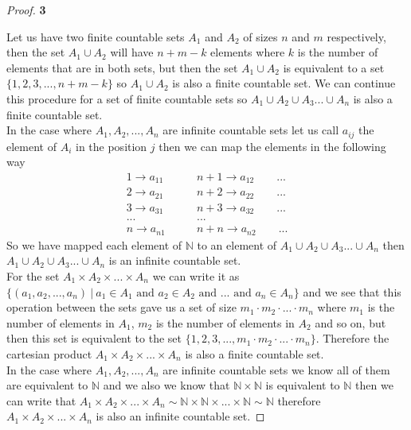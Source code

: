 \documentclass[11pt]{article}
\newcommand{\N}{\mathbb{N}}
\theoremstyle{definition}
\begin{document}
	\begin{proof}{\textbf{3}}

        Let us have two finite countable sets $A_1$ and $A_2$ of sizes $n$ and $m$
        respectively, then the set $A_1 \cup A_2$ will have $n + m - k$ elements
        where $k$ is the number of elements that are in both sets, but then the set
        $A_1 \cup A_2$ is equivalent to a set $\{1,2,3,...,n+m-k\}$ so $A_1 \cup A_2$
        is also a finite countable set.
        We can continue this procedure for a set of finite countable sets so 
        $A_1 \cup A_2 \cup A_3 ... \cup A_n$ is also a finite countable set.\\
        In the case  where $A_1, A_2, ..., A_n$ are infinite countable sets let us call
        $a_{ij}$ the element of $A_i$ in the position $j$ then we can map the elements
        in the following way
        \begin{align*}
            1 \rightarrow a_{11} &\quad\quad n+1 \rightarrow a_{12} \quad\quad ...\\
            2 \rightarrow a_{21} &\quad\quad n+2 \rightarrow a_{22} \quad\quad ...\\
            3 \rightarrow a_{31} &\quad\quad n+3 \rightarrow a_{32} \quad\quad ...\\
            ... &\quad\quad ...\\
            n \rightarrow a_{n1} &\quad\quad n+n \rightarrow a_{n2} \quad\quad ...
        \end{align*}
        So we have mapped each element of $\N$ to an element of
        $A_1 \cup A_2 \cup A_3 ... \cup A_n$ then $A_1 \cup A_2 \cup A_3 ... \cup A_n$
        is an infinite countable set.\\

        For the set $A_1 \times A_2 \times ... \times A_n$ we can write it as
        $\{(a_1, a_2, ..., a_n) ~|~
        a_1 \in A_1\text{ and }a_2 \in A_2\text{ and }... \text{ and }a_n \in A_n\}$ and
         we see that this operation between the sets gave us a set of size
        $m_1 \cdot m_2 \cdot ... \cdot m_n$
        where $m_1$ is the number of elements in $A_1$, $m_2$ is the number of
        elements in $A_2$ and so on, but then this set is equivalent to
        the set $\{1,2,3,...,m_1 \cdot m_2 \cdot ... \cdot m_n\}$. Therefore the
        cartesian product $A_1 \times A_2 \times ... \times A_n$ is also a finite
        countable set.\\
        In the case  where $A_1, A_2, ..., A_n$ are infinite countable sets we know all
        of them are equivalent to $\N$ and we also we know that $\N \times \N$ is
        equivalent to $\N$ then we can write that
        $A_1 \times A_2 \times ... \times A_n \sim 
        \N \times \N \times ... \times \N \sim \N$
        therefore $A_1 \times A_2 \times ... \times A_n$ is also an infinite countable
        set. 
    \end{proof}
\end{document}
